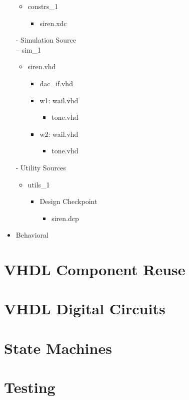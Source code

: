 \begin{itemize}
\begin{itemize}
             \item constrs\_1
             \begin{itemize}
                 \item siren.xdc
             \end{itemize}
         \end{itemize}
         - Simulation Source\\
         -- sim\_1\\
         \begin{itemize}
             \item siren.vhd
             \begin{itemize}
                 \item dac\_if.vhd
                 \item w1: wail.vhd
                 \begin{itemize}
                     \item tone.vhd
                 \end{itemize}
                 \item w2: wail.vhd
                 \begin{itemize}
                     \item tone.vhd
                 \end{itemize}
             \end{itemize}
         \end{itemize}
         - Utility Sources\\
         \begin{itemize}
             \item utils\_1
             \begin{itemize}
                 \item Design Checkpoint
                 \begin{itemize}
                     \item siren.dcp
                 \end{itemize}
             \end{itemize}
         \end{itemize}
     \item Behavioral
 \end{itemize}
 \section{VHDL Component Reuse}
 \section{VHDL Digital Circuits}
 \section{State Machines}
 \section{Testing}
